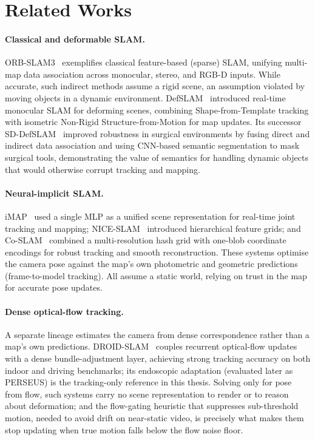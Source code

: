 \documentclass{article}
\begin{document}
\section{Related Works}
\paragraph{Classical and deformable SLAM.}
ORB-SLAM3~\cite{Campos2021} exemplifies classical feature-based (sparse) SLAM, unifying multi-map data association across monocular, stereo, and RGB-D inputs. While accurate, such indirect methods assume a rigid scene, an assumption violated by moving objects in a dynamic environment. DefSLAM~\cite{Lamarca2020} introduced real-time monocular SLAM for deforming scenes, combining Shape-from-Template tracking with isometric Non-Rigid Structure-from-Motion for map updates. Its successor SD-DefSLAM~\cite{Rodrguez2020} improved robustness in surgical environments by fusing direct and indirect data association and using CNN-based semantic segmentation to mask surgical tools, demonstrating the value of semantics for handling dynamic objects that would otherwise corrupt tracking and mapping.

\paragraph{Neural-implicit SLAM.}
iMAP~\cite{Sucar2021} used a single MLP as a unified scene representation for real-time joint tracking and mapping; NICE-SLAM~\cite{Zhu2022} introduced hierarchical feature grids; and Co-SLAM~\cite{Wang2023} combined a multi-resolution hash grid with one-blob coordinate encodings for robust tracking and smooth reconstruction. These systems optimise the camera pose against the map's own photometric and geometric predictions (frame-to-model tracking). All assume a static world, relying on trust in the map for accurate pose updates.

\paragraph{Dense optical-flow tracking.}
A separate lineage estimates the camera from dense correspondence rather than a map's own predictions. DROID-SLAM~\cite{Teed2022} couples recurrent optical-flow updates with a dense bundle-adjustment layer, achieving strong tracking accuracy on both indoor and driving benchmarks; its endoscopic adaptation (evaluated later as PERSEUS) is the tracking-only reference in this thesis. Solving only for pose from flow, such systems carry no scene representation to render or to reason about deformation; and the flow-gating heuristic that suppresses sub-threshold motion, needed to avoid drift on near-static video, is precisely what makes them stop updating when true motion falls below the flow noise floor.
\end{document}
